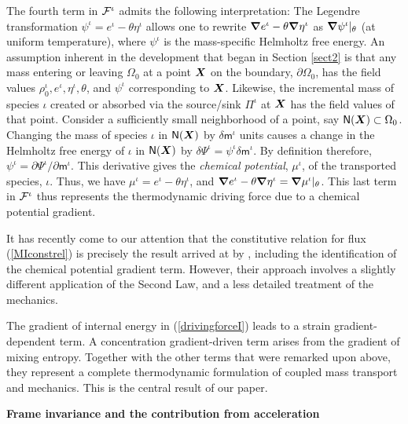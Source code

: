 The fourth term in $\boldmath{{\mathcal F}}^\iota$ admits the following
interpretation: The Legendre transformation $\psi^\iota = e^\iota
- \theta\eta^\iota$ allows one to rewrite $\mbox{\boldmath$\nabla$} e^\iota -
\theta\mbox{\boldmath$\nabla$}\eta^\iota$ as $\mbox{\boldmath$\nabla$}\psi^\iota\vert_\theta$ (at
uniform temperature), where $\psi^\iota$ is the mass-specific
Helmholtz free energy. An assumption inherent in the development
that began in Section \ref{sect2} is that any mass entering or
leaving $\Omega_0$ at a point $\mbox{\boldmath$ X$}$ on the boundary,
$\partial\Omega_0$, has the field values
$\rho_0^\iota,e^\iota,\eta^\iota,\theta$, and $\psi^\iota$
corresponding to $\mbox{\boldmath$ X$}$. Likewise, the incremental mass of species
$\iota$ created or absorbed via the source/sink $\Pi^\iota$ at
$\mbox{\boldmath$ X$}$ has the field values of that point. Consider a sufficiently
small neighborhood of a point, say
$\mathsf{N}(\mbox{\boldmath$ X$})\subset\Omega_0$. Changing the mass of species
$\iota$ in $\mathsf{N}(\mbox{\boldmath$ X$})$ by $\delta\mathsf{m}^\iota$ units
causes a change in the Helmholtz free energy of $\iota$ in
$\mathsf{N}(\mbox{\boldmath$ X$})$ by $\delta\Psi^\iota =
\psi^\iota\delta\mathsf{m}^\iota$. By definition therefore,
$\psi^\iota =
\partial\Psi^\iota/\partial\mathsf{m}^\iota$. This derivative gives the \emph{chemical
potential}, $\mu^\iota$, of the transported species, $\iota$.
Thus, we have $\mu^\iota = e^\iota - \theta\eta^\iota$, and
$\mbox{\boldmath$\nabla$} e^\iota -\theta\mbox{\boldmath$\nabla$}\eta^\iota =
\mbox{\boldmath$\nabla$}\mu^\iota\vert_\theta$. This last term in
${\boldmath{{\mathcal F}}}^\iota$ thus represents the thermodynamic driving
force due to a chemical potential gradient.

It has recently come to our attention that the constitutive
relation for flux (\ref{MIconstrel}) is precisely the result
arrived at by \citet{DeGrootMazur:1984}, including the
identification of the chemical potential gradient term. However,
their approach involves a slightly different application of the
Second Law, and a less detailed treatment of the mechanics.

The gradient of internal energy in (\ref{drivingforceI}) leads to
a strain gradient-dependent term. A concentration gradient-driven
term arises from the gradient of mixing entropy. Together with the
other terms that were remarked upon above, they represent a
complete thermodynamic formulation of coupled mass transport and
mechanics. This is the central result of our paper.

{\bf  Frame invariance and the contribution from acceleration}\\

